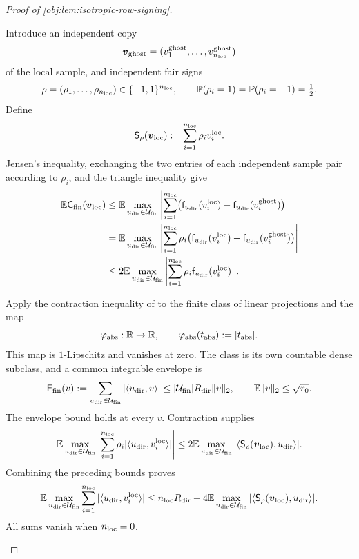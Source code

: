 \begin{proof}[Proof of \cref{obj:lem:isotropic-row-signing}]
\begin{enumerate}
Introduce an independent copy
\[
\boldsymbol v_{\rm ghost}
=(v^{\rm ghost}_1,\ldots,v^{\rm ghost}_{n_{\rm loc}})
\]
of the local sample, and independent fair signs
\[
\rho=(\rho_1,\ldots,\rho_{n_{\rm loc}})
\in\{-1,1\}^{n_{\rm loc}},
\qquad
\mathbb P(\rho_i=1)=\mathbb P(\rho_i=-1)=\tfrac12.
\]
Define
\[
\mathsf S_\rho(\boldsymbol v_{\rm loc})
:=\sum_{i=1}^{n_{\rm loc}}\rho_i v_i^{\rm loc}.
\]
Jensen's inequality, exchanging the two entries of each independent sample pair according to \(\rho_i\), and the triangle inequality give
\[
\begin{aligned}
\mathbb E\mathsf C_{\rm fin}(\boldsymbol v_{\rm loc})
&\leq
\mathbb E\max_{u_{\rm dir}\in\mathcal U_{\rm fin}}
\left|\sum_{i=1}^{n_{\rm loc}}
\bigl(\mathsf f_{u_{\rm dir}}(v_i^{\rm loc})
-\mathsf f_{u_{\rm dir}}(v_i^{\rm ghost})\bigr)\right|\\
&=
\mathbb E\max_{u_{\rm dir}\in\mathcal U_{\rm fin}}
\left|\sum_{i=1}^{n_{\rm loc}}\rho_i
\bigl(\mathsf f_{u_{\rm dir}}(v_i^{\rm loc})
-\mathsf f_{u_{\rm dir}}(v_i^{\rm ghost})\bigr)\right|\\
&\leq
2\mathbb E\max_{u_{\rm dir}\in\mathcal U_{\rm fin}}
\left|\sum_{i=1}^{n_{\rm loc}}\rho_i
\mathsf f_{u_{\rm dir}}(v_i^{\rm loc})\right|.
\end{aligned}
\]

Apply the contraction inequality of
\citep[Theorem~12(4), with Rademacher complexity as in Definition~2]{BartlettMendelson2002Complexities}
to the finite class of linear projections and the map
\[
\varphi_{\rm abs}:\mathbb R\to\mathbb R,
\qquad
\varphi_{\rm abs}(t_{\rm abs}):=|t_{\rm abs}|.
\]
This map is \(1\)-Lipschitz and vanishes at zero. The class is its own countable dense subclass, and a common integrable envelope is
\[
\mathsf E_{\rm fin}(v)
:=\sum_{u_{\rm dir}\in\mathcal U_{\rm fin}}
|\langle u_{\rm dir},v\rangle|
\leq|\mathcal U_{\rm fin}|R_{\rm dir}\|v\|_2,
\qquad
\mathbb E\|v\|_2\leq\sqrt{r_0}.
\]
The envelope bound holds at every \(v\). Contraction supplies
\[
\mathbb E\max_{u_{\rm dir}\in\mathcal U_{\rm fin}}
\left|\sum_{i=1}^{n_{\rm loc}}\rho_i
|\langle u_{\rm dir},v_i^{\rm loc}\rangle|\right|
\leq
2\mathbb E\max_{u_{\rm dir}\in\mathcal U_{\rm fin}}
|\langle \mathsf S_\rho(\boldsymbol v_{\rm loc}),u_{\rm dir}\rangle|.
\]
Combining the preceding bounds proves
\[
\mathbb E\max_{u_{\rm dir}\in\mathcal U_{\rm fin}}
\sum_{i=1}^{n_{\rm loc}}|\langle u_{\rm dir},v_i^{\rm loc}\rangle|
\leq n_{\rm loc}R_{\rm dir}
+4\mathbb E\max_{u_{\rm dir}\in\mathcal U_{\rm fin}}
|\langle \mathsf S_\rho(\boldsymbol v_{\rm loc}),u_{\rm dir}\rangle|.
\]
All sums vanish when \(n_{\rm loc}=0\).


\end{enumerate}
\end{proof}
